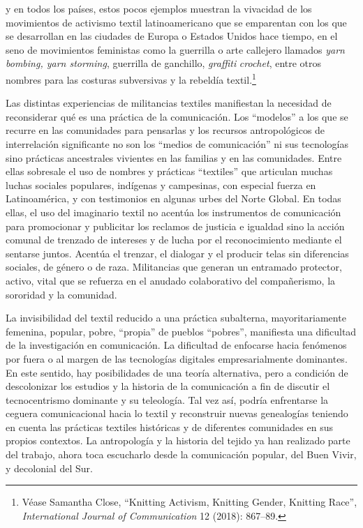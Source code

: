 \documentclass{tufte-handout}
\begin{document}
y en todos los países, estos pocos ejemplos muestran la vivacidad de los
movimientos de activismo textil latinoamericano que se emparentan con
los que se desarrollan en las ciudades de Europa o Estados Unidos hace
tiempo, en el seno de movimientos feministas como la guerrilla o arte
callejero llamados \emph{yarn bombing, yarn storming}, guerrilla de
ganchillo, \emph{graffiti} \emph{crochet}, entre otros nombres para las
costuras subversivas y la rebeldía textil.\footnote{Véase Samantha
  Close, ``Knitting Activism, Knitting Gender, Knitting Race'',
  \emph{International Journal of Communication} 12 (2018): 867--89.}

Las distintas experiencias de militancias textiles manifiestan la
necesidad de reconsiderar qué es una práctica de la comunicación. Los
``modelos'' a los que se recurre en las comunidades para pensarlas y los
recursos antropológicos de interrelación significante no son los
``medios de comunicación'' ni sus tecnologías sino prácticas ancestrales
vivientes en las familias y en las comunidades. Entre ellas sobresale el
uso de nombres y prácticas ``textiles'' que articulan muchas luchas
sociales populares, indígenas y campesinas, con especial fuerza en
Latinoamérica, y con testimonios en algunas urbes del Norte Global. En
todas ellas, el uso del imaginario textil no acentúa los instrumentos de
comunicación para promocionar y publicitar los reclamos de justicia e
igualdad sino la acción comunal de trenzado de intereses y de lucha por
el reconocimiento mediante el sentarse juntos. Acentúa el trenzar, el
dialogar y el producir telas sin diferencias sociales, de género o de
raza. Militancias que generan un entramado protector, activo, vital que
se refuerza en el anudado colaborativo del compañerismo, la sororidad y
la comunidad.

La invisibilidad del textil reducido a una práctica subalterna,
mayoritariamente femenina, popular, pobre, ``propia'' de pueblos
``pobres'', manifiesta una dificultad de la investigación en
comunicación. La dificultad de enfocarse hacia fenómenos por fuera o al
margen de las tecnologías digitales empresarialmente dominantes. En este
sentido, hay posibilidades de una teoría alternativa, pero a condición
de descolonizar los estudios y la historia de la comunicación a fin de
discutir el tecnocentrismo dominante y su teleología. Tal vez así,
podría enfrentarse la ceguera comunicacional hacia lo textil y
reconstruir nuevas genealogías teniendo en cuenta las prácticas textiles
históricas y de diferentes comunidades en sus propios contextos. La
antropología y la historia del tejido ya han realizado parte del
trabajo, ahora toca escucharlo desde la comunicación popular, del Buen
Vivir, y decolonial del Sur.
\end{document}
